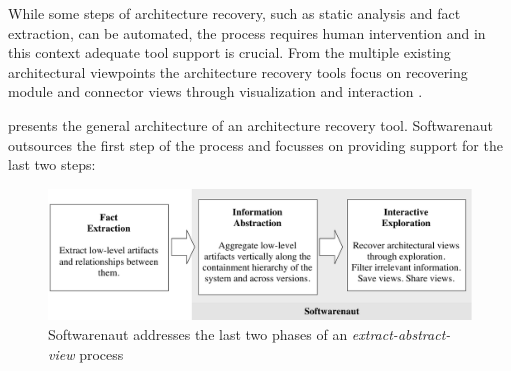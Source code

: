 \documentclass[preprint,12pt]{elsarticle}
\newcommand\on[1]{\nbc{ON}{#1}{red}} %
\begin{document}
While some steps of architecture recovery, such as static analysis and fact extraction, can be automated, the process requires human intervention and in this context adequate tool support is crucial. From the multiple existing architectural viewpoints the architecture recovery tools focus on recovering module and connector views through visualization and interaction \cite{murphy-reflexion, muller-rigi, storey-shrimp}. 







 presents the general architecture of an architecture recovery tool. Softwarenaut outsources the first step of the process and focusses on providing support for the last two steps: 

\begin{figure}[t]
\begin{center}
\includegraphics[width=\linewidth]{SnautWorkflow}
\caption{Softwarenaut addresses the last two phases of an {\em extract-abstract-view} process}
\end{center}
\end{figure}
\end{document}
